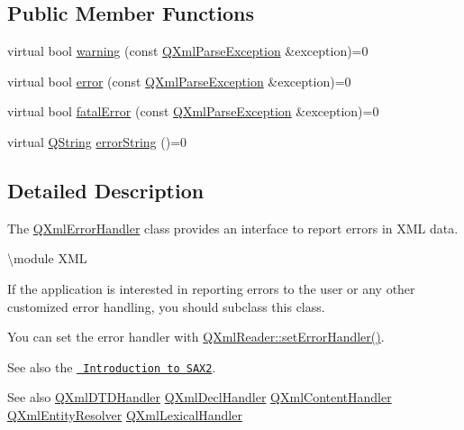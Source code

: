 \subsection*{Public Member Functions}
\begin{DoxyCompactItemize}
\item 
virtual bool \mbox{\hyperlink{class_q_xml_error_handler_a79ae0cce3316a76b7777c6e90b101afe}{warning}} (const \mbox{\hyperlink{class_q_xml_parse_exception}{Q\+Xml\+Parse\+Exception}} \&exception)=0
\item 
virtual bool \mbox{\hyperlink{class_q_xml_error_handler_aa7e25c4198fa16a0312fd48e5718217c}{error}} (const \mbox{\hyperlink{class_q_xml_parse_exception}{Q\+Xml\+Parse\+Exception}} \&exception)=0
\item 
virtual bool \mbox{\hyperlink{class_q_xml_error_handler_aaa8c1ad1b42a5257cf2344c7fe101797}{fatal\+Error}} (const \mbox{\hyperlink{class_q_xml_parse_exception}{Q\+Xml\+Parse\+Exception}} \&exception)=0
\item 
virtual \mbox{\hyperlink{class_q_string}{Q\+String}} \mbox{\hyperlink{class_q_xml_error_handler_a7b265803d41782e6207b497fe09beff0}{error\+String}} ()=0
\end{DoxyCompactItemize}


\subsection{Detailed Description}
The \mbox{\hyperlink{class_q_xml_error_handler}{Q\+Xml\+Error\+Handler}} class provides an interface to report errors in X\+ML data. 

\textbackslash{}module X\+ML

If the application is interested in reporting errors to the user or any other customized error handling, you should subclass this class.

You can set the error handler with \mbox{\hyperlink{class_q_xml_reader_a97cab92522d1ceb8f6da94a161a72ee2}{Q\+Xml\+Reader\+::set\+Error\+Handler()}}.

See also the \href{xml.html\#introSAX2}{\texttt{ Introduction to S\+A\+X2}}.

\begin{DoxySeeAlso}{See also}
\mbox{\hyperlink{class_q_xml_d_t_d_handler}{Q\+Xml\+D\+T\+D\+Handler}} \mbox{\hyperlink{class_q_xml_decl_handler}{Q\+Xml\+Decl\+Handler}} \mbox{\hyperlink{class_q_xml_content_handler}{Q\+Xml\+Content\+Handler}} \mbox{\hyperlink{class_q_xml_entity_resolver}{Q\+Xml\+Entity\+Resolver}} \mbox{\hyperlink{class_q_xml_lexical_handler}{Q\+Xml\+Lexical\+Handler}} 
\end{DoxySeeAlso}


